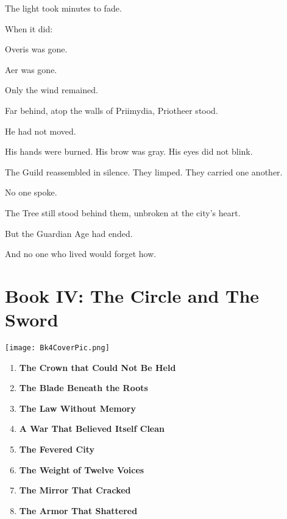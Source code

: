 \documentclass[9pt]{article}
\begin{document}
The light took minutes to fade.

When it did:

Overis was gone.

Aer was gone.

Only the wind remained.

Far behind, atop the walls of Priimydia, Priotheer stood.

He had not moved.

His hands were burned. His brow was gray. His eyes did not blink.

The Guild reassembled in silence. They limped. They carried one another.

No one spoke.

The Tree still stood behind them, unbroken at the city’s heart.

But the Guardian Age had ended.

And no one who lived would forget how.


\newpage

\section*{Book IV: The Circle and The Sword}

\vspace{.80in}

\begin{center}
    \texttt{[image: Bk4CoverPic.png]}
\end{center}

\vspace{.80in}

\begin{enumerate}
    \item \textbf{The Crown that Could Not Be Held} 

    \vspace{1em}
    \item \textbf{The Blade Beneath the Roots} 

    \vspace{1em}
    \item \textbf{The Law Without Memory} 

    \vspace{1em}
    \item \textbf{A War That Believed Itself Clean} 

    \vspace{1em}
    \item \textbf{The Fevered City} 

    \vspace{1em}
    \item \textbf{The Weight of Twelve Voices}

    \vspace{1em}
    \item \textbf{The Mirror That Cracked} 

    \vspace{1em}
    \item \textbf{The Armor That Shattered} 

\end{enumerate}
\end{document}
